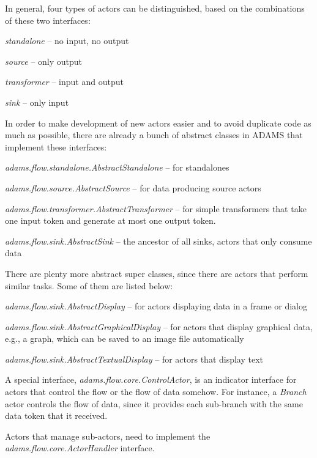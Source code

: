 In general, four types of actors can be distinguished, based on the combinations
of these two interfaces:
\begin{tight_itemize}
	\item \textit{standalone} -- no input, no output
	\item \textit{source} -- only output
	\item \textit{transformer} -- input and output
	\item \textit{sink} -- only input
\end{tight_itemize}
In order to make development of new actors easier and to avoid duplicate code
as much as possible, there are already a bunch of abstract classes in ADAMS
that implement these interfaces:
\begin{tight_itemize}
	\item \textit{adams.flow.standalone.AbstractStandalone} -- for standalones
	\item \textit{adams.flow.source.AbstractSource} -- for data producing source actors
	\item \textit{adams.flow.transformer.AbstractTransformer} -- for simple transformers
    that take one input token and generate at most one output token.
	\item \textit{adams.flow.sink.AbstractSink} -- the ancestor of all sinks, actors that
    only consume data
\end{tight_itemize}
There are plenty more abstract super classes, since there are actors that
perform similar tasks. Some of them are listed below:
\begin{tight_itemize}
	\item \textit{adams.flow.sink.AbstractDisplay} -- for actors displaying data in a
    frame or dialog
	\item \textit{adams.flow.sink.AbstractGraphicalDisplay} -- for actors that display
    graphical data, e.g., a graph, which can be saved to an image file automatically
	\item \textit{adams.flow.sink.AbstractTextualDisplay} -- for actors that display text
\end{tight_itemize}
A special interface, \textit{adams.flow.core.ControlActor}, is an indicator
interface for actors that control the flow or the flow of data somehow. For
instance, a \textit{Branch} actor controls the flow of data, since it provides
each sub-branch with the same data token that it received.

Actors that manage sub-actors, need to implement the
\textit{adams.flow.core.ActorHandler} interface.

